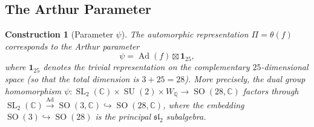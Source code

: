 \documentclass[12pt]{amsart}
\newtheorem{construction}[theorem]{Construction}
\theoremstyle{definition}
\DeclareMathOperator\SO{SO}
\DeclareMathOperator\SL{SL}
\DeclareMathOperator\SU{SU}
\DeclareMathOperator\Ad{Ad}
\newcommand{\Q}{\mathbb{Q}}
\newcommand{\C}{\mathbb{C}}
\begin{document}
\subsection{The Arthur Parameter}

\begin{construction}[Parameter $\psi$]
The automorphic representation $\Pi = \theta(f)$ corresponds to the Arthur parameter
\[
\psi = \Ad(f) \boxtimes \mathbf{1}_{25},
\]
where $\mathbf{1}_{25}$ denotes the trivial representation on the complementary $25$-dimensional space (so that the total dimension is $3 + 25 = 28$). More precisely, the dual group homomorphism $\psi \colon \SL_2(\C) \times \SU(2) \times W_{\Q} \to \SO(28, \C)$ factors through $\SL_2(\C) \xrightarrow{\Ad} \SO(3, \C) \hookrightarrow \SO(28, \C)$, where the embedding $\SO(3) \hookrightarrow \SO(28)$ is the principal $\mathfrak{sl}_2$ subalgebra.
\end{construction}
\end{document}

